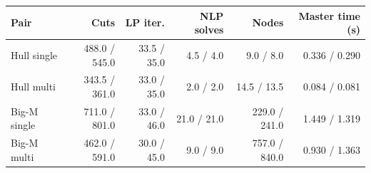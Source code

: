 \begin{tabular}{lrrrrr}
\toprule
Pair & Cuts & LP iter. & NLP solves & Nodes & Master time (s) \\
\midrule
Hull single & 488.0 / 545.0 & 33.5 / 35.0 & 4.5 / 4.0 & 9.0 / 8.0 & 0.336 / 0.290 \\
Hull multi & 343.5 / 361.0 & 33.0 / 35.0 & 2.0 / 2.0 & 14.5 / 13.5 & 0.084 / 0.081 \\
Big-M single & 711.0 / 801.0 & 33.0 / 46.0 & 21.0 / 21.0 & 229.0 / 241.0 & 1.449 / 1.319 \\
Big-M multi & 462.0 / 591.0 & 30.0 / 45.0 & 9.0 / 9.0 & 757.0 / 840.0 & 0.930 / 1.363 \\
\bottomrule
\end{tabular}
